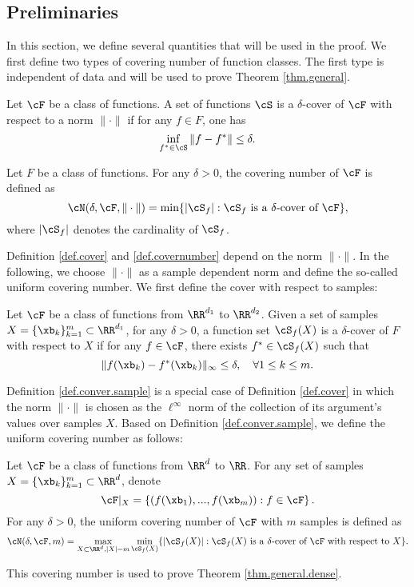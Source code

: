 \documentclass[11pt]{article} %
\begin{document}
\subsection{Preliminaries}
In this section, we define several quantities that will be used in the proof. We first define two types of covering number of function classes. The first type is independent of data and will be used to prove Theorem \ref{thm.general}.
\begin{definition}[Cover]\label{def.cover}
	Let $\cF$ be a class of functions. A set of functions $\cS$ is a $\delta$-cover of $\cF$ with respect to a norm $\|\cdot \|$ if for any $f\in F$, one has
	$$
	\inf_{f^*\in \cS}\|f-f^*\|\leq \delta.
	$$
\end{definition}
\begin{definition}\label{def.covernumber}
	Let $F$ be a class of functions. For any $\delta>0$, the covering number of $\cF$ is defined as
	$$
	\cN(\delta,\cF,\|\cdot\|)=\min\{ |\cS_f| : \text{$\cS_f$ is a $\delta$-cover of $\cF$} \},
	$$
	where $|\cS_f|$ denotes the cardinality of $\cS_f$.
\end{definition}

Definition \ref{def.cover} and \ref{def.covernumber} depend on the norm $\|\cdot\|$. In the following, we choose $\|\cdot\|$ as a sample dependent norm and define the so-called uniform covering number. We first define the cover with respect to samples:
\begin{definition}\label{def.conver.sample}
	Let $\cF$ be a class of functions from $\RR^{d_1}$ to $\RR^{d_2}$. Given a set of samples $X=\{\xb_k\}_{k=1}^m\subset \RR^{d_1}$, for any $\delta>0$, a function set $\cS_f(X)$ is a $\delta$-cover of $F$ with respect to $X$ if for any $f\in \cF$, there exists $f^*\in \cS_f(X)$ such that
	$$
	\|f(\xb_k)-f^*(\xb_k)\|_{\infty}\leq \delta, \quad \forall 1\leq k\leq m.
	$$
\end{definition}
Definition \ref{def.conver.sample} is a special case of Definition \ref{def.cover} in which the norm $\|\cdot\|$ is chosen as the $\ell^{\infty}$ norm of the collection of its argument's values over samples $X$. Based on Definition \ref{def.conver.sample}, we define the uniform covering number as follows:
\begin{definition}\label{def.covernumber.n}
	Let $\cF$ be a class of functions from $\RR^d$ to $\RR$. For any set of samples $X=\{\xb_k\}_{k=1}^m\subset \RR^d$, denote
	$$
	\cF|_{X}=\left\{\left(f(\xb_1),...,f(\xb_m)\right): f\in \cF\right\}.
	$$
	For any $\delta>0$, the uniform covering number of $\cF$ with $m$ samples is defined as
	\begin{align}
		\cN(\delta,\cF,m)=\max_{X\subset \RR^d,|X|=m}\min_{\cS_f(X)}\{|\cS_f(X)|:\cS_f(X) \mbox{ is a $\delta$-cover of $\cF$ with respect to $X$}\}.
	\end{align}
\end{definition}
This covering number is used to prove Theorem \ref{thm.general.dense}.
\end{document}
